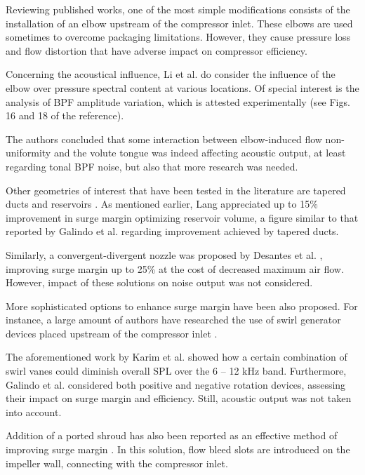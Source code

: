 Reviewing published works, one of the most simple modifications consists of the installation of an elbow upstream of the compressor inlet. These elbows are used sometimes to overcome packaging limitations. However, they cause pressure loss \cite{engeda2003inlet,li2012numerical} and flow distortion \cite{serrano2013optimization} that have adverse impact on compressor efficiency.

Concerning the acoustical influence, Li et al. \cite{li2012numerical} do consider the influence of the elbow over pressure spectral content at various locations. Of special interest is the analysis of BPF amplitude variation, which is attested experimentally (see Figs. 16 and 18 of the reference). 

The authors concluded that some interaction between elbow-induced flow non-uniformity and the volute tongue was indeed affecting acoustic output, at least regarding tonal BPF noise, but also that more research was needed.

Other geometries of interest that have been tested in the literature are tapered ducts \cite{galindo2011measurement,lang2011contribucion} and reservoirs \cite{lang2011contribucion}. As mentioned earlier, Lang appreciated up to 15\% improvement in surge margin optimizing reservoir volume, a figure similar to that reported by Galindo et al. \cite{galindo2011measurement} regarding improvement achieved by tapered ducts. 

Similarly, a convergent-divergent nozzle was proposed by Desantes et al. \cite{desantes2011potential}, improving surge margin up to 25\% at the cost of decreased maximum air flow. However, impact of these solutions on noise output was not considered.

More sophisticated options to enhance surge margin have been also proposed. For instance, a large amount of authors have researched the use of swirl generator devices placed upstream of the compressor inlet \cite{kyrtatos1980application,coppinger2000performance}. 

The aforementioned work by Karim et al. \cite{karim2013computational} showed how a certain combination of swirl vanes could diminish overall SPL over the 6 -- 12 kHz band. Furthermore, Galindo et al. \cite{galindo2007potential} considered both positive and negative rotation devices, assessing their impact on surge margin and efficiency. Still, acoustic output was not taken into account.

Addition of a ported shroud has also been reported as an effective method of improving surge margin \cite{guillou2010characterization,semlitsch2014numerical}. In this solution, flow bleed slots are introduced on the impeller wall, connecting with the compressor inlet. 

